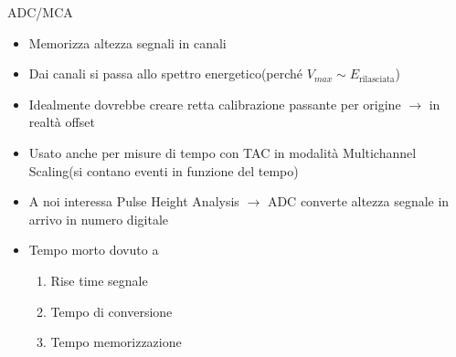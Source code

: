 \documentclass{beamer}
\begin{document}
\begin{frame}{ADC/MCA}
    \begin{itemize}
        \item Memorizza altezza segnali in canali
        \item Dai canali si passa allo spettro energetico(perché $V_{max}\sim E_{\textrm{rilasciata}}$)
        \item Idealmente dovrebbe creare retta calibrazione passante per origine $\to$ in realtà offset
        \item Usato anche per misure di tempo con TAC in modalità Multichannel Scaling(si contano eventi in funzione del tempo)
        \item A noi interessa Pulse Height Analysis $\to$ ADC converte altezza segnale in arrivo in numero digitale
        \item Tempo morto dovuto a \begin{enumerate}
            \item Rise time segnale
            \item Tempo di conversione
            \item Tempo memorizzazione
        \end{enumerate}
    \end{itemize}
\end{frame}
\end{document}
